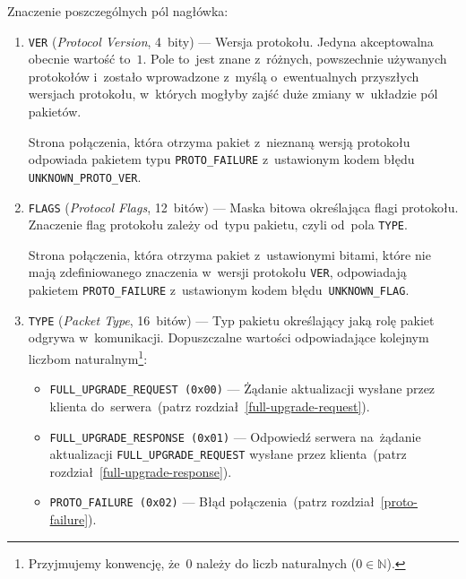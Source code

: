 \documentclass[thesis]{subfiles}
\begin{document}
Znaczenie poszczególnych pól nagłówka:\mynobreakpar
\begin{enumerate}
	\item \texttt{VER} (\emph{Protocol Version}, 4~bity) --- Wersja protokołu. Jedyna akceptowalna obecnie wartość to~$1$. Pole to~jest znane z~różnych, powszechnie używanych protokołów i~zostało wprowadzone z~myślą o~ewentualnych przyszłych wersjach protokołu, w~których mogłyby zajść duże zmiany w~układzie pól pakietów.

	Strona połączenia, która otrzyma pakiet z~nieznaną wersją protokołu odpowiada pakietem typu \texttt{PROTO\_FAILURE} z~ustawionym kodem błędu \texttt{UNKNOWN\_PROTO\_VER}.

	\item \texttt{FLAGS} (\emph{Protocol Flags}, 12~bitów) --- Maska bitowa określająca flagi protokołu. Znaczenie flag protokołu zależy od~typu pakietu, czyli od~pola \texttt{TYPE}.

	Strona połączenia, która otrzyma pakiet z~ustawionymi bitami, które nie mają zdefiniowanego znaczenia w~wersji protokołu \texttt{VER}, odpowiadają pakietem \texttt{PROTO\_FAILURE} z~ustawionym kodem błędu~\texttt{UNKNOWN\_FLAG}.

	\item \texttt{TYPE} (\emph{Packet Type}, 16~bitów) --- Typ pakietu określający jaką rolę pakiet odgrywa w~komunikacji. Dopuszczalne wartości odpowiadające kolejnym liczbom naturalnym\footnote{Przyjmujemy konwencję, że~$0$ należy do liczb naturalnych ($0\in\mathbb{N}$).}:
	\begin{itemize}
		\item \texttt{FULL\_UPGRADE\_REQUEST (0x00)} --- Żądanie aktualizacji wysłane przez klienta do~serwera~(patrz rozdział~\ref{full-upgrade-request}).
		\item \texttt{FULL\_UPGRADE\_RESPONSE (0x01)} --- Odpowiedź serwera na~żądanie aktualizacji \texttt{FULL\_UPGRADE\_REQUEST} wysłane przez klienta~(patrz rozdział~\ref{full-upgrade-response}).
		\item \texttt{PROTO\_FAILURE (0x02)} --- Błąd połączenia~(patrz rozdział~\ref{proto-failure}).
	\end{itemize}


\end{enumerate}
\end{document}
